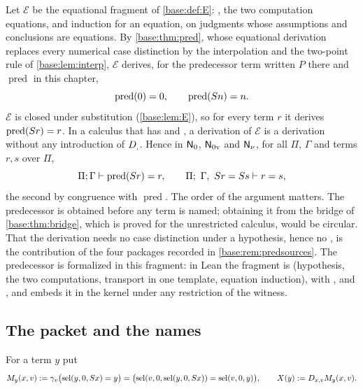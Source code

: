 Let $\mathcal E$ be the equational fragment of \cref{base:def:E}:
, the two computation equations,  and induction
for an equation, on judgments whose assumptions and conclusions are
equations.  By \cref{base:thm:pred}, whose equational derivation replaces
every numerical case distinction by the interpolation and the two-point
rule of \cref{base:lem:interp}, $\mathcal E$ derives, for the predecessor
term written $P$ there and $\operatorname{pred}$ in this chapter,
\begin{equation}
 \operatorname{pred}(0)=0,\qquad\operatorname{pred}(S n)=n .
 \label{wit:eq:pred}
\end{equation}
$\mathcal E$ is closed under substitution (\cref{base:lem:E}), so for every
term $r$ it derives $\operatorname{pred}(S r)=r$.  In a calculus that has
 and , a derivation of $\mathcal E$ is a
derivation without any introduction of $D_{,}$.  Hence in $\mathsf{N}_{0}$,
$\mathsf{N}_{0\mathrm v}$ and $\mathsf{N}_{\nu}$, for all $\Pi$, $\Gamma$ and terms
$r,s$ over $\Pi$,
\begin{equation}
 \Pi;\Gamma\vdash\operatorname{pred}(S r)=r,
 \qquad
 \Pi;\ \Gamma,\ S r=S s\vdash r=s ,
 \label{wit:eq:inj}
\end{equation}
the second by congruence with $\operatorname{pred}$.  The order of the
argument matters.  The predecessor is obtained before any term is named;
obtaining it from the bridge of \cref{base:thm:bridge}, which is proved for
the unrestricted calculus, would be circular.  That the derivation needs no
case distinction under a hypothesis, hence no , is the
contribution of the four packages recorded in \cref{base:rem:predsources}.
The predecessor is formalized in this fragment: in Lean the fragment is
 (hypothesis, the two computations, transport in one template,
equation induction), with , 
and , and  embeds it in the kernel
under any restriction of the witness.

\subsection{The packet and the names}

\begin{definition}
\label{wit:def:packet}
For a term $y$ put
\[
 M_y(x,v)\mathrel{:=}\gamma_v\bigl(\operatorname{sel}(y,0,S x)=y\bigr)
  =\bigl(\operatorname{sel}(v,0,\operatorname{sel}(y,0,S x))=\operatorname{sel}(v,0,y)\bigr),
 \qquad
 X(y)\mathrel{:=}D_{x,v}M_y(x,v).
\]
\end{definition}

